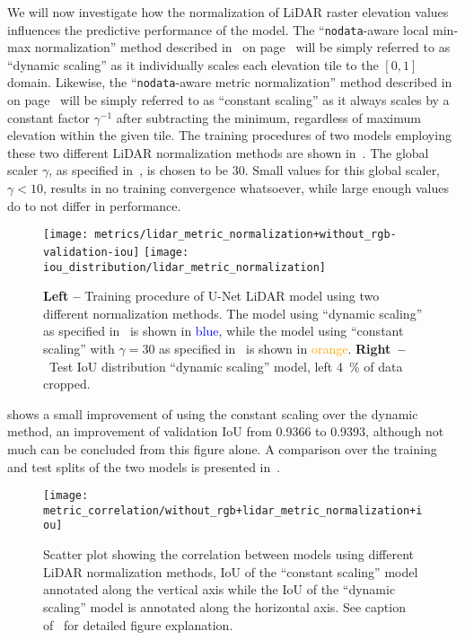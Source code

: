 We will now investigate how the normalization of LiDAR raster elevation values influences the predictive performance of the model.
The \enquote{\texttt{nodata}-aware local min-max normalization} method described in~ on page~\pageref{alg:local-min-max-scaling} will be simply referred to as \enquote{dynamic scaling} as it individually scales each elevation tile to the $[0, 1]$ domain.
Likewise, the \enquote{\texttt{nodata}-aware metric normalization} method described in~ on page~\pageref{alg:metric-normalization} will be simply referred to as \enquote{constant scaling} as it always scales by a constant factor $\gamma^{-1}$ after subtracting the minimum, regardless of maximum elevation within the given tile.
The training procedures of two models employing these two different LiDAR normalization methods are shown in~.
The global scaler $\gamma$, as specified in~, is chosen to be 30.
Small values for this global scaler, $\gamma < 10$, results in no training convergence whatsoever, while large enough values do to not differ in performance.

\begin{figure}[H]
  \centering
  \texttt{[image: metrics/lidar\_metric\_normalization+without\_rgb-validation-iou]}
  \texttt{[image: iou\_distribution/lidar\_metric\_normalization]}
  \caption{%
    \textbf{Left --} Training procedure of U-Net LiDAR model using two different normalization methods.
    The model using \enquote{dynamic scaling} as specified in~ is shown in \textcolor{blue}{blue}, while the model using \enquote{constant scaling} with $\gamma = 30$ as specified in~ is shown in \textcolor{orange}{orange}.
    \textbf{Right~--}~Test IoU distribution \enquote{dynamic scaling} model, left \SI{4}{\percent} of data cropped.
  }%
  \label{fig:normalization-training}
\end{figure}

 shows a small improvement of using the constant scaling over the dynamic method, an improvement of validation IoU from \num{0.9366} to \num{0.9393}, although not much can be concluded from this figure alone.
A comparison over the training and test splits of the two models is presented in~.

\begin{figure}[H]
  \centering
  \texttt{[image: metric\_correlation/without\_rgb+lidar\_metric\_normalization+iou]}
  \caption{%
    Scatter plot showing the correlation between models using different LiDAR normalization methods, IoU of the \enquote{constant scaling} model annotated along the vertical axis while the IoU of the \enquote{dynamic scaling} model is annotated along the horizontal axis.
    See caption of~ for detailed figure explanation.
  }%
  \label{fig:normalization-correlation}
\end{figure}


